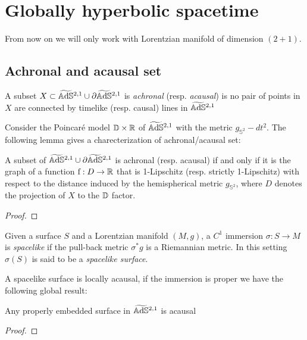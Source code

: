 \chapter{Globally hyperbolic spacetime}\label{chapter:4}
From now on we will only work with Lorentzian manifold of dimension $(2+1)$.

\section{Achronal and acausal set}

\begin{definition}
    A subset $X \subset \widetilde{\mathbb{A}\mathrm{d}\mathbb{S}}{}^{2,1} \cup \partial\widetilde{\mathbb{A}\mathrm{d}\mathbb{S}}{}^{2,1}$ is \textit{achronal} (resp. \textit{acausal}) is no pair of points in $X$ are connected by timelike (resp. causal) lines in $\widetilde{\mathbb{A}\mathrm{d}\mathbb{S}}{}^{2,1}$
\end{definition}
Consider the Poincaré model $\mathbb{D}\times\mathbb{R}$ of $\widetilde{\mathbb{A}\mathrm{d}\mathbb{S}}{}^{2,1}$ with the metric $g_{\mathbb{S}^2} - dt^2$. The following lemma gives a charecterization of achronal/acausal set:
\begin{lemma}
    A subset of $\widetilde{\mathbb{A}\mathrm{d}\mathbb{S}}{}^{2,1} \cup \partial\widetilde{\mathbb{A}\mathrm{d}\mathbb{S}}{}^{2,1}$ is achronal (resp. acausal) if and only if it is the graph of a function $\text{f} : D \to \mathbb{R}$ that is 1-Lipschitz (resp. strictly 1-Lipschitz) with respect to the distance induced by the hemispherical metric $g_{\mathbb{S}^2}$, where $D$ denotes the projection of $X$ to the $\mathbb{D}$ factor.
\end{lemma} 
\begin{proof}
\end{proof}

\begin{definition}
    Given a surface $S$ and a Lorentzian manifold $(M,g)$, a $C^1$ immersion $\sigma : S \to M$ is \textit{spacelike} if the pull-back metric $\sigma^* g$ is a Riemannian metric. In this setting $\sigma(S)$ is said to be a \textit{spacelike surface}.
\end{definition}
A spacelike surface is locally acausal, if the immersion is proper we have the following global result:
\begin{lemma}
    Any properly embedded surface in $\widetilde{\mathbb{A}\mathrm{d}\mathbb{S}}{}^{2,1}$ is acausal
\end{lemma}
\begin{proof}
\end{proof}

